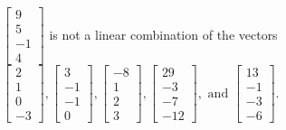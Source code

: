 \begin{exercise}
\begin{exerciseStatement}
  \end{exerciseStatement}
  \begin{exerciseAnswer}
   \(\left[\begin{array}{c}
9 \\
5 \\
-1 \\
4
\end{array}\right]\) 
  	 is not  
	a linear combination of the vectors \(\left[\begin{array}{c}
2 \\
1 \\
0 \\
-3
\end{array}\right] , \left[\begin{array}{c}
3 \\
-1 \\
-1 \\
0
\end{array}\right] , \left[\begin{array}{c}
-8 \\
1 \\
2 \\
3
\end{array}\right] , \left[\begin{array}{c}
29 \\
-3 \\
-7 \\
-12
\end{array}\right] , \text{ and } \left[\begin{array}{c}
13 \\
-1 \\
-3 \\
-6
\end{array}\right]\).

	
  


  \end{exerciseAnswer}
\end{exercise}